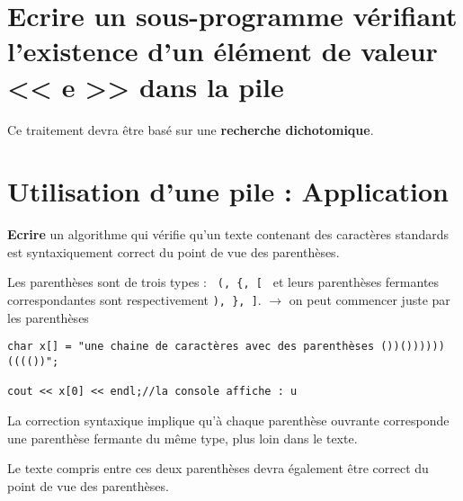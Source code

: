 \documentclass[french]{article}
\begin{document}
\section{Ecrire un sous-programme vérifiant l’existence d’un élément de valeur << e >> dans la pile}
Ce traitement devra être basé sur une \textbf{recherche dichotomique}.

\section{Utilisation d’une pile : Application}
\textbf{Ecrire} un algorithme qui vérifie qu’un texte contenant des caractères standards est syntaxiquement correct du point de vue des parenthèses.

Les parenthèses sont de trois types : \texttt{ (, \{, [ } et leurs parenthèses fermantes correspondantes sont respectivement \texttt{), \}, ]}.
$\rightarrow$ on peut commencer juste par les parenthèses
\begin{lstlisting}[caption={Rappel : Déclaration d'une chaîne de caractères},label=stringrappel]
char x[] = "une chaine de caractères avec des parenthèses ())())))))(((())";

cout << x[0] << endl;//la console affiche : u
\end{lstlisting}

La correction syntaxique implique qu’à chaque parenthèse ouvrante corresponde une parenthèse fermante du même type, plus loin dans le texte.


Le texte compris entre ces deux parenthèses devra également être correct du point de vue des parenthèses.
\end{document}
